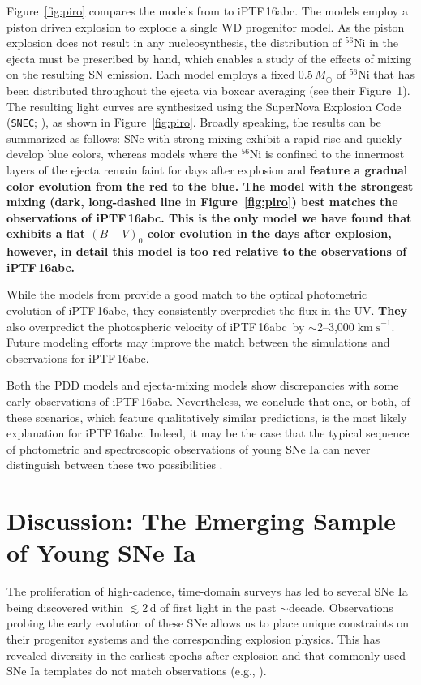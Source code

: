 \documentclass[twocolumn]{aastex61}
\newcommand{\sm}{M_\odot}
\newcommand{\abc}{iPTF\,16abc}
\newcommand{\sneia}{SNe Ia}
\begin{document}
Figure~\ref{fig:piro} compares the models from \citet{2016ApJ...826...96P} to
\abc. The \citeauthor{2016ApJ...826...96P} models employ a piston driven
explosion to explode a single WD progenitor model. As the piston explosion
does not result in any nucleosynthesis, the distribution of $^{56}$Ni in the
ejecta must be prescribed by hand, which enables a study of the effects of
mixing on the resulting SN emission. Each model employs a fixed $0.5\,\sm$ of
$^{56}$Ni that has been distributed throughout the ejecta via boxcar averaging
(see their Figure~1). The resulting light curves are synthesized using the
SuperNova Explosion Code (\texttt{SNEC}; \citealt{2015ApJ...814...63M}), as
shown in Figure~\ref{fig:piro}. Broadly speaking, the results can be
summarized as follows: SNe with strong mixing exhibit a rapid rise and quickly
develop blue colors, whereas models where the $^{56}$Ni is confined to the
innermost layers of the ejecta remain faint for days after explosion and
\textbf{feature a gradual color evolution from the red to the blue. The model
with the strongest mixing (dark, long-dashed line in Figure~\ref{fig:piro})
best matches the observations of \abc. This is the only model we have found
that exhibits a flat $(B-V)_0$ color evolution in the days after explosion,
however, in detail this model is too red relative to the observations of \abc.
}

While the models from \citet{2016ApJ...826...96P} provide a good match to the
optical photometric evolution of \abc, they consistently overpredict the flux
in the UV. \textbf{They} also overpredict the
photospheric velocity of \abc\ by $\sim$2--3,000$\; \mathrm{km \; s}^{-1}$.
Future modeling efforts may improve the match between the simulations and
observations for \abc.

Both the PDD models and ejecta-mixing models show discrepancies with some
early observations of \abc. Nevertheless, we conclude that one, or both, of
these scenarios, which feature qualitatively similar predictions, is the most
likely explanation for \abc. Indeed, it may be the case that the typical
sequence of photometric and spectroscopic observations of young SNe Ia can
never distinguish between these two possibilities \citep{2017MNRAS.472.2787N}.

\section{\textbf{Discussion: The Emerging Sample of Young \sneia}}

The proliferation of high-cadence, time-domain surveys has led to several SNe Ia being discovered within $\lesssim$2\,d of first light in the past $\sim$decade. Observations probing the early evolution of these SNe allows us to place unique constraints on their progenitor systems and the corresponding explosion physics. This has revealed diversity in the earliest epochs after explosion and that commonly used SNe Ia templates do not match observations (e.g., \citealt{2012ApJ...744...38F}).
\end{document}
